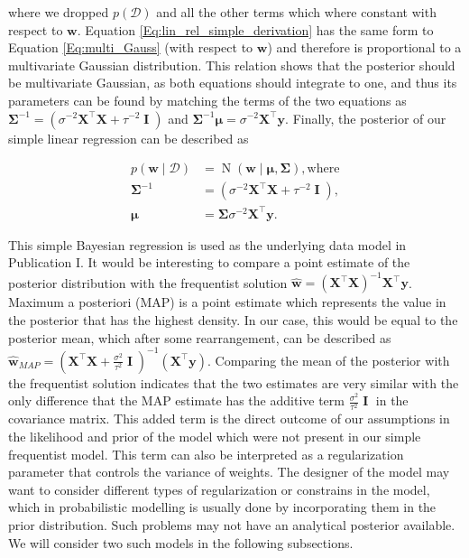 \documentclass[dissertation,math,vertlayout,pdfa,colorlinks]{aaltoseries}
\newcommand{\bw}{\bm{w}}
\newcommand{\bX}{\bm{X}}
\newcommand{\by}{\bm{y}}
\newcommand{\bD}{\mathcal{D}}
\DeclareMathOperator{\eye}{\textbf{I}}
\DeclareMathOperator{\normalpdf}{N}
\newcommand{\tp}{^{\top}}
\begin{document}
\noindent where we dropped $p(\bD)$ and all the other terms which where constant with respect to $\bw$. Equation \ref{Eq:lin_rel_simple_derivation} has the same form to Equation \ref{Eq:multi_Gauss} (with respect to $\bw$) and therefore is proportional to a multivariate Gaussian distribution. This relation shows that the posterior should be multivariate Gaussian, as both equations should integrate to one, and thus its parameters can be found by matching the terms of the two equations as $\bm{\Sigma}^{-1} = ( \sigma^{-2}\bX\tp\bX + \tau^{-2} \eye ) $ and $\bm{\Sigma}^{-1}\bm{\mu} = \sigma^{-2}\bX\tp\by$. Finally, the posterior of our simple linear regression can be described as 

\begin{align}\label{Eq:lin_rel_simple_posterior}
	p(\bw \mid \bD) &= \normalpdf(\bw \mid \bm{\mu},\bm{\Sigma}), \text{where}\\
	\bm{\Sigma}^{-1} &= (\sigma^{-2}\bX\tp\bX + \tau^{-2} \eye ), \nonumber\\
	\bm{\mu} &= \bm{\Sigma}\sigma^{-2}\bX\tp\by. \nonumber
\end{align}

This simple Bayesian regression is used as the underlying data model in Publication I. It would be interesting to compare a point estimate of the posterior distribution with the frequentist solution $\hat{\bw} = (\bX \tp \bX)^{-1}\bX\tp \by$. Maximum a posteriori (MAP) is a point estimate which represents the value in the posterior that has the highest density. In our case, this would be equal to the posterior mean, which after some rearrangement, can be described as $\hat{\bw}_{MAP} = (\bX\tp\bX + \frac{\sigma^{2}}{\tau^{2}} \eye )^{-1}(\bX\tp\by)$. Comparing the mean of the posterior with the frequentist solution indicates that the two estimates are very similar with the only difference that the MAP estimate has the additive term $\frac{\sigma^{2}}{\tau^{2}} \eye$ in the covariance matrix. This added term is the direct outcome of our assumptions in the likelihood and prior of the model which were not present in our simple frequentist model. This term can also be interpreted as a regularization parameter that controls the variance of weights. The designer of the model may want to consider different types of regularization or constrains in the model, which in probabilistic modelling is usually done by incorporating them in the prior distribution. Such problems may not have an analytical posterior available. We will consider two such models in the following subsections.
\end{document}
